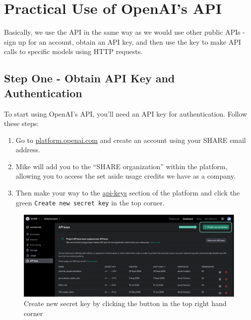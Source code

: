 \documentclass[
  letterpaper,
  DIV=11,
  numbers=noendperiod]{scrreprt}
\begin{document}
\section{Practical Use of OpenAI's
API}\label{practical-use-of-openais-api}

Basically, we use the API in the same way as we would use other public
APIs - sign up for an account, obtain an API key, and then use the key
to make API calls to specific models using HTTP requests.

\subsection{Step One - Obtain API Key and
Authentication}\label{step-one---obtain-api-key-and-authentication}

To start using OpenAI's API, you'll need an API key for authentication.
Follow these steps:

\begin{enumerate}
\def\labelenumi{\arabic{enumi}.}
\item
  Go to \url{platform.openai.com} and create an account using your SHARE
  email address.
\item
  Mike will add you to the ``SHARE organization'' within the platform,
  allowing you to access the set aside usage credits we have as a
  company.
\item
  Then make your way to the
  \href{https://platform.openai.com/api-keys}{api-keys} section of the
  platform and click the green \texttt{Create\ new\ secret\ key} in the
  top corner.
\end{enumerate}

\begin{figure}[H]

{\centering \includegraphics{./img/new_api_key.png}

}

\caption{Create new secret key by clicking the button in the top right
hand corner}

\end{figure}%
\end{document}
